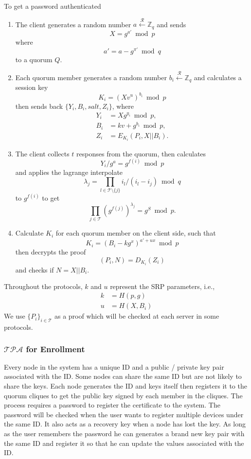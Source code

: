 To get a password authenticated
\begin{enumerate}
\item The client generates a random number
  $a \xleftarrow{\mathcal{R}} \mathbb{Z}_q$
  and sends
  \[
    X = g^{a'} \bmod p
  \]
  where
  \[
    a' = a - g^{\pi'} \bmod q
  \]
  to a quorum $Q$.
\item Each quorum member generates a random number
  $b_i \xleftarrow{\mathcal{R}} \mathbb{Z}_q$
  and calculates a session key
  \[ K_i = (Xv^u)^{b_i} \bmod p \]
  then sends back $\{Y_i, B_i, salt, Z_i\}$,
  where
  \begin{align*}
    Y_i &= X g^{y_i} \bmod p, \\
    B_i &= kv + g^{b_i} \bmod p, \\
    Z_i &= E_{K_i}(P_i, X ||B_i).
  \end{align*}
\item The client collects $t$ responses from the quorum, then
  calculates
  \[
    Y_i/g^a = g^{f(i)} \bmod p
  \]
  and applies the lagrange interpolate
  \[
    \lambda_j = \prod_{l \in \mathcal{T} \setminus \{j\}}
    i_l / (i_l - i_j) \bmod q
  \]
  to $g^{f(i)}$ 
  to get
  \[
    \prod_{j \in \mathcal{T}}(g^{f(j)})^{\lambda_j} = g^S \bmod p.
  \]
\item Calculate $K_i$ for each quorum member on the client side, such
  that
  \[
    K_i = (B_i - kg^x)^{a'+ux} \bmod p
  \]
  then decrypts the proof
  \[
    (P_i, N) = D_{K_i}(Z_i)
  \]
  and checks if $N = X||B_i$.
\end{enumerate}
Throughout the protocols, $k$ and $u$ represent the SRP parameters, i.e.,
\begin{align*}
  k &= H(p, g) \\
  u &= H(X, B_i)
\end{align*}
We use $\{P_i\}_{i \in \mathcal{T}}$ as a proof which will be
checked at each server in some protocols.

\subsubsection*{$\mathcal{TPA}$ for Enrollment}
Every node in the system has a unique ID and a public / private key
pair associated with the ID. Some nodes can share the same ID but are
not likely to share the keys. Each node generates the ID and keys
itself then registers it to the quorum cliques to get the public key
signed by each member in the cliques. The process requires a password
to register the certificate to the system. The password will be checked
when the user wants to register multiple devices under the
same ID. It also acts as a recovery key when a node has lost the
key. As long as the user remembers the password he can generates a
brand new key pair with the same ID and register it so that he can
update the values associated with the ID.\\

